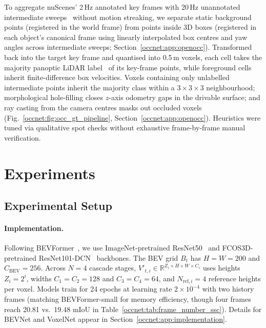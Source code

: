 To aggregate nuScenes' 2\,Hz annotated key frames with 20\,Hz unannotated intermediate sweeps~\cite{caesar2020nuscenes,fong2022panoptic} without motion streaking, we separate static background points (registered in the world frame) from points inside 3D boxes (registered in each object's canonical frame using linearly interpolated box centres and yaw angles across intermediate sweeps; Section~\ref{occnet:app:openocc}). Transformed back into the target key frame and quantised into 0.5\,m voxels, each cell takes the majority panoptic LiDAR label~\cite{fong2022panoptic} of its key-frame points, while foreground cells inherit finite-difference box velocities. Voxels containing only unlabelled intermediate points inherit the majority class within a $3\times3\times3$ neighbourhood; morphological hole-filling closes $z$-axis odometry gaps in the drivable surface; and ray casting from the camera centres masks out occluded voxels (Fig.~\ref{occnet:fig:occ_gt_pipeline}, Section~\ref{occnet:app:openocc}). Heuristics were tuned via qualitative spot checks without exhaustive frame-by-frame manual verification.

\section{Experiments}\label{occnet:sec:experiments}

\subsection{Experimental Setup}\label{occnet:sec:exp_setup}

\paragraph{Implementation.} Following BEVFormer~\cite{li2022bevformer}, we use ImageNet-pretrained ResNet50~\cite{he2016deep,deng2009imagenet} and FCOS3D-pretrained ResNet101-DCN~\cite{he2016deep,wang2021fcos3d} backbones. The BEV grid $B_t$ has $H=W=200$ and $C_{\text{BEV}}=256$. Across $N=4$ cascade stages, $V'_{t,i}\in\mathbb{R}^{Z_i\times H\times W\times C_i}$ uses heights $Z_i=2^i$, widths $C_1=C_2=128$ and $C_3=C_4=64$, and $N_{\text{ref},i}=4$ reference heights per voxel. Models train for 24 epochs at learning rate $2\times10^{-4}$ with two history frames (matching BEVFormer-small for memory efficiency, though four frames reach 20.81 vs.\ 19.48 mIoU in Table~\ref{occnet:tab:frame_number_ssc}). Details for BEVNet and VoxelNet appear in Section~\ref{occnet:app:implementation}.

